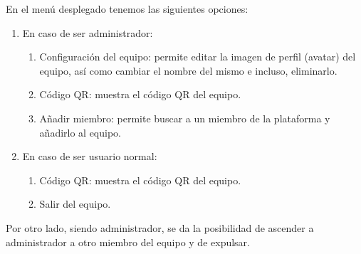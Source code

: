 \documentclass[twoside]{report}
\begin{document}
En el menú desplegado tenemos las siguientes opciones:
\begin{enumerate}
	\item En caso de ser administrador:
	\begin{enumerate}
		\item Configuración del equipo: permite editar la imagen de perfil (avatar) del equipo, así como cambiar el nombre del mismo e incluso, eliminarlo.
		\item Código QR: muestra el código QR del equipo.
		\item Añadir miembro: permite buscar a un miembro de la plataforma y añadirlo al equipo.
	\end{enumerate}
	\item En caso de ser usuario normal:
	\begin{enumerate}
		\item Código QR: muestra el código QR del equipo.
		\item Salir del equipo.
	\end{enumerate}
\end{enumerate}
Por otro lado, siendo administrador, se da la posibilidad de ascender a administrador a otro miembro del equipo y de expulsar.
\end{document}
